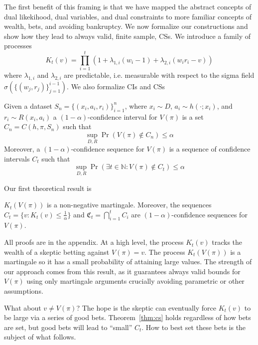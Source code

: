 The first benefit of this framing is that we have mapped the abstract concepts
of dual likekihood, dual variables, and dual constraints to more familiar
concepts of wealth, bets, and avoiding bankruptcy.  We now formalize our
constructions and show how they lead to always valid, finite sample, CSs. We
introduce a family of processes
\[
K_t(v) = \prod_{i=1}^t (1+\lambda_{1,i} (w_i-1) +\lambda_{2,i}(w_i r_i - v))
\]
where $\lambda_{1,i}$ and $\lambda_{2,i}$ are predictable, i.e. measurable with
respect to the sigma field $\sigma(\{(w_j,r_j)\}_{j=1}^{i-1})$.  We also formalize CIs and CSs
\begin{definition}
Given a dataset $S_n=\{(x_i,a_i,r_i)\}_{i=1}^n$, where 
$x_i \sim D$, $a_i\sim h(\cdot;x_i)$, and $r_i \sim R(x_i,a_i)$ 
a $(1-\alpha)$-confidence interval 
for $V(\pi)$ is a set $C_n = C(h,\pi,S_n)$ such that
\[
\sup_{D,R} \Pr(V(\pi) \notin C_n) \leq \alpha
\]
Moreover, a $(1-\alpha)$-confidence sequence for $V(\pi)$ 
is a sequence of confidence intervals $C_t$ such that
\[
\sup_{D,R} \Pr(\exists t \in \mathbb{N}: V(\pi) \notin C_t) \leq \alpha
\]
\end{definition}
Our first theoretical result is 
\begin{theorem}
\label{thm:martingale}
\label{thm:ville}
\label{thm:cs}
$K_t(V(\pi))$ is a non-negative martingale. Moreover,
the sequences $C_t = \{v:K_t(v)\leq \frac{1}{\alpha}\}$ 
and $\mathfrak{C}_t = \bigcap_{i=1}^t C_i$
are $(1-\alpha)$-confidence sequences for $V(\pi)$.
\end{theorem}
All proofs are in the appendix.  
At a high level, the process $K_t(v)$
tracks the wealth of a skeptic betting against $V(\pi)=v$. The process
$K_t(V(\pi))$ is a martingale so it has a small probability of attaining large values. 
The strength of our approach comes from this result, 
as it guarantees always valid bounds for $V(\pi)$ using 
only martingale arguments crucially avoiding
parametric or other assumptions.

What about $v \neq V(\pi)$? The hope is the skeptic can eventually 
force $K_t(v)$ to be large via a series of good bets. 
Theorem~\ref{thm:cs} holds regardless of how bets are set,
but good bets will lead to ``small'' $C_t$.
How to best set these bets is the subject of what
follows.



